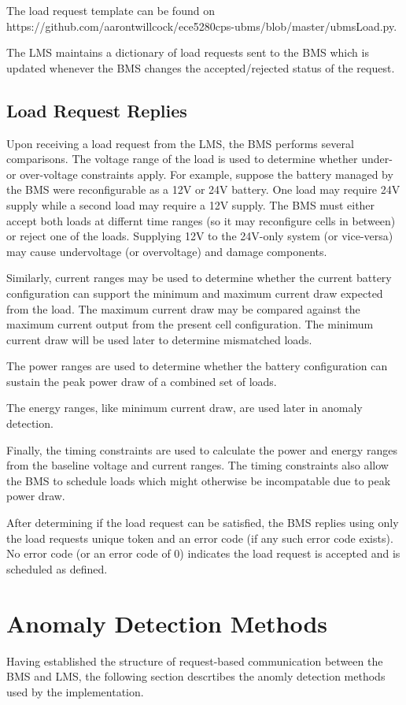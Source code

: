\documentclass[11pt,conference,draftcls,onecolumn]{IEEEtran}
\begin{document}
The load request template can be found on https://github.com/aarontwillcock/ece5280cps-ubms/blob/master/ubmsLoad.py.

The LMS maintains a dictionary of load requests sent to the BMS which is updated whenever the BMS changes the accepted/rejected status of the request. 

\subsection{Load Request Replies}
Upon receiving a load request from the LMS, the BMS performs several comparisons.
The voltage range of the load is used to determine whether under- or over-voltage constraints apply.
For example, suppose the battery managed by the BMS were reconfigurable as a 12V or 24V battery. One load may require 24V supply while a second load may require a 12V supply. The BMS must either accept both loads at differnt time ranges (so it may reconfigure cells in between) or reject one of the loads.
Supplying 12V to the 24V-only system (or vice-versa) may cause undervoltage (or overvoltage) and damage components.

Similarly, current ranges may be used to determine whether the current battery configuration can support the minimum and maximum current draw expected from the load.
The maximum current draw may be compared against the maximum current output from the present cell configuration.
The minimum current draw will be used later to determine mismatched loads.

The power ranges are used to determine whether the battery configuration can sustain the peak power draw of a combined set of loads.

The energy ranges, like minimum current draw, are used later in anomaly detection.

Finally, the timing constraints are used to calculate the power and energy ranges from the baseline voltage and current ranges.
The timing constraints also allow the BMS to schedule loads which might otherwise be incompatable due to peak power draw.

After determining if the load request can be satisfied, the BMS replies using only the load requests unique token and an error code (if any such error code exists).
No error code (or an error code of 0) indicates the load request is accepted and is scheduled as defined.

\section{Anomaly Detection Methods}\label{sec:anomalyDetection}
Having established the structure of request-based communication between the BMS and LMS, the following section descrtibes the anomly detection methods used by the implementation.
\end{document}
